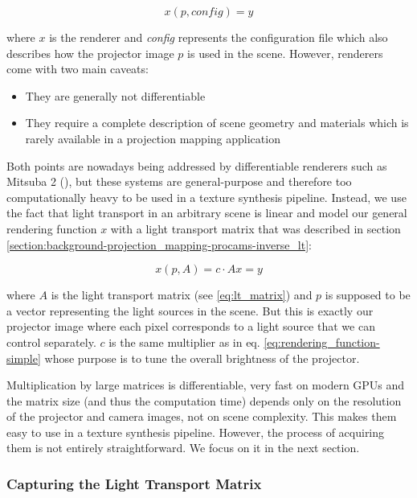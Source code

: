 \begin{equation}
    \label{eq:rendering_function-renderer}
    x(p, \textit{config}) = y
\end{equation}

where \(x\) is the renderer and \textit{config} represents the configuration file which also describes how the projector image \(p\) is used in the scene. However, renderers come with two main caveats:

\begin{itemize}
    \item They are generally not differentiable
    \item They require a complete description of scene geometry and materials which is rarely available in a projection mapping application
\end{itemize}

Both points are nowadays being addressed by differentiable renderers such as Mitsuba 2 (\citet{Mitsuba2}), but these systems are general-purpose and therefore too computationally heavy to be used in a texture synthesis pipeline. Instead, we use the fact that light transport in an arbitrary scene is linear and model our general rendering function \(x\) with a light transport matrix that was described in section \ref{section:background-projection_mapping-procams-inverse_lt}:

\begin{equation}
    \label{eq:rendering_function-lt_matrix}
    x(p, A) = c \cdot Ax = y
\end{equation}

where \(A\) is the light transport matrix (see \ref{eq:lt_matrix}) and \(p\) is supposed to be a vector representing the light sources in the scene. But this is exactly our projector image where each pixel corresponds to a light source that we can control separately. \(c\) is the same multiplier as in eq. \ref{eq:rendering_function-simple} whose purpose is to tune the overall brightness of the projector.

Multiplication by large matrices is differentiable, very fast on modern GPUs and the matrix size (and thus the computation time) depends only on the resolution of the projector and camera images, not on scene complexity. This makes them easy to use in a texture synthesis pipeline. However, the process of acquiring them is not entirely straightforward. We focus on it in the next section.

\subsubsection{Capturing the Light Transport Matrix}
\label{section:methods-rendering_function-general-lt_capture}


